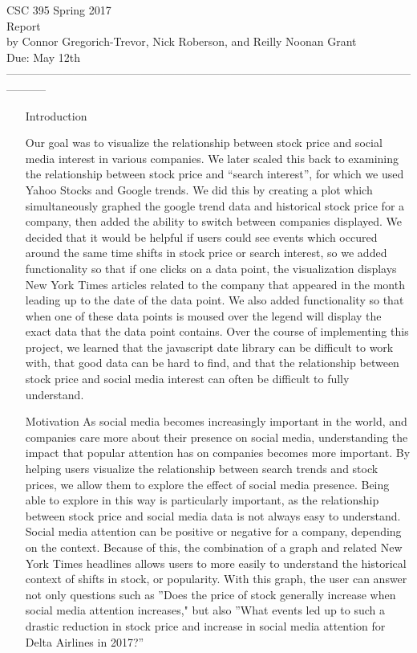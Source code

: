 \documentclass[12pt]{article}
\begin{document}
\begin{center} 
  CSC 395 Spring 2017 \\
  Report\\
  by Connor Gregorich-Trevor, Nick Roberson, and Reilly Noonan Grant\\
  Due: May 12th \\

----------------------------------------------------------------------------------------------------------------------- \end{center}

\begin{enumerate}
  \item[Introduction] 
    
    Our goal was to visualize the relationship between stock price and social media interest 
    in various companies. We later scaled this back to examining the relationship between 
    stock price and ``search interest'', for which we used Yahoo Stocks and Google trends. 
    We did this by creating a plot which simultaneously graphed the google trend data and
    historical stock price for a company, then added the ability to switch between companies
    displayed. We decided that it would be helpful if users could see events which occured 
    around the same time shifts in stock price or search interest, so we added functionality 
    so that if one clicks on a data point, the visualization displays New York Times articles
    related to the company that appeared in the month leading up to the date of the data point.
    We also added functionality so that when one of these data points is moused over 
    the legend will display the exact data that the data point contains. Over the course of
    implementing this project, we learned that the javascript date library can be difficult 
    to work with, that good data can be hard to find, and that the relationship between 
    stock price and social media interest can often be difficult to fully understand.
    
    
  \item[Motivation] 
    As social media becomes increasingly important in the world, and companies care more about 
    their presence on social media, understanding the impact that popular attention has on companies 
    becomes more important. By helping users visualize the relationship between search trends
    and stock prices, we allow them to explore the effect of social media presence. Being able to 
    explore in this way is particularly important, as the relationship between stock price and social
    media data is not always easy to understand. Social media attention can be positive or negative
    for a company, depending on the context. Because of this, the combination of a graph 
    and related New York Times headlines allows users to more easily to understand the historical 
    context of shifts in stock, or popularity. With this graph, the user can answer not only 
    questions such as ''Does the price of stock generally increase when social media attention increases,"
    but also ''What events led up to such a drastic reduction in stock price and increase in social media attention for Delta Airlines in 2017?''


\end{enumerate}
\end{document}
